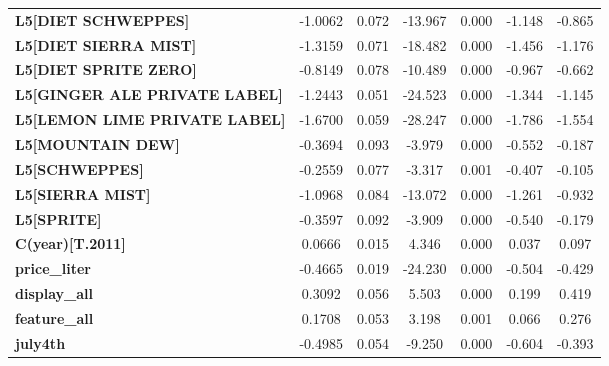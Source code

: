 \begin{center}
\begin{tabular}{lcccccc}
\textbf{L5[DIET SCHWEPPES]}                &      -1.0062  &        0.072     &   -13.967  &         0.000        &       -1.148    &       -0.865     \\
\textbf{L5[DIET SIERRA MIST]}              &      -1.3159  &        0.071     &   -18.482  &         0.000        &       -1.456    &       -1.176     \\
\textbf{L5[DIET SPRITE ZERO]}              &      -0.8149  &        0.078     &   -10.489  &         0.000        &       -0.967    &       -0.662     \\
\textbf{L5[GINGER ALE PRIVATE LABEL]}      &      -1.2443  &        0.051     &   -24.523  &         0.000        &       -1.344    &       -1.145     \\
\textbf{L5[LEMON LIME PRIVATE LABEL]}      &      -1.6700  &        0.059     &   -28.247  &         0.000        &       -1.786    &       -1.554     \\
\textbf{L5[MOUNTAIN DEW]}                  &      -0.3694  &        0.093     &    -3.979  &         0.000        &       -0.552    &       -0.187     \\
\textbf{L5[SCHWEPPES]}                     &      -0.2559  &        0.077     &    -3.317  &         0.001        &       -0.407    &       -0.105     \\
\textbf{L5[SIERRA MIST]}                   &      -1.0968  &        0.084     &   -13.072  &         0.000        &       -1.261    &       -0.932     \\
\textbf{L5[SPRITE]}                        &      -0.3597  &        0.092     &    -3.909  &         0.000        &       -0.540    &       -0.179     \\
\textbf{C(year)[T.2011]}                   &       0.0666  &        0.015     &     4.346  &         0.000        &        0.037    &        0.097     \\
\textbf{price\_liter}                      &      -0.4665  &        0.019     &   -24.230  &         0.000        &       -0.504    &       -0.429     \\
\textbf{display\_all}                      &       0.3092  &        0.056     &     5.503  &         0.000        &        0.199    &        0.419     \\
\textbf{feature\_all}                      &       0.1708  &        0.053     &     3.198  &         0.001        &        0.066    &        0.276     \\
\textbf{july4th}                           &      -0.4985  &        0.054     &    -9.250  &         0.000        &       -0.604    &       -0.393     \\

\end{tabular}
\end{center}
